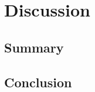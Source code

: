 \chapter{Discussion}

\lipsum[35-41]

\section{Summary}
\lipsum[42-43]

\section{Conclusion\label{sec:conclusions}}
\lipsum[44-50]
